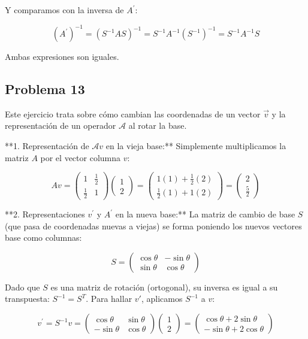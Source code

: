 \documentclass[11pt,spanish]{article}
\begin{document}
Y comparamos con la inversa de $A^{\prime}$:

$$(A^{\prime})^{-1} = (S^{-1} A S)^{-1} = S^{-1} A^{-1} (S^{-1})^{-1} = S^{-1} A^{-1} S$$



Ambas expresiones son iguales.

\subsection*{Problema 13}

Este ejercicio trata sobre cómo cambian las coordenadas de un vector $\vec{v}$ y la representación de un operador $\mathcal{A}$ al rotar la base.

**1. Representación de $\mathcal{A}v$ en la vieja base:**
Simplemente multiplicamos la matriz $A$ por el vector columna $v$:


$$Av = \begin{pmatrix} 1 & \frac{1}{2} \\ \frac{1}{2} & 1 \end{pmatrix} \begin{pmatrix} 1 \\ 2 \end{pmatrix} = \begin{pmatrix} 1(1) + \frac{1}{2}(2) \\ \frac{1}{2}(1) + 1(2) \end{pmatrix} = \begin{pmatrix} 2 \\ \frac{5}{2} \end{pmatrix}$$

**2. Representaciones $v^{\prime}$ y $A^{\prime}$ en la nueva base:**
La matriz de cambio de base $S$ (que pasa de coordenadas nuevas a viejas) se forma poniendo los nuevos vectores base como columnas:


$$S = \begin{pmatrix} \cos\theta & -\sin\theta \\ \sin\theta & \cos\theta \end{pmatrix}$$

Dado que $S$ es una matriz de rotación (ortogonal), su inversa es igual a su transpuesta: $S^{-1} = S^{T}$.
Para hallar $v'$, aplicamos $S^{-1}$ a $v$:


$$v^{\prime} = S^{-1}v = \begin{pmatrix} \cos\theta & \sin\theta \\ -\sin\theta & \cos\theta \end{pmatrix} \begin{pmatrix} 1 \\ 2 \end{pmatrix} = \begin{pmatrix} \cos\theta + 2\sin\theta \\ -\sin\theta + 2\cos\theta \end{pmatrix}$$
\end{document}
